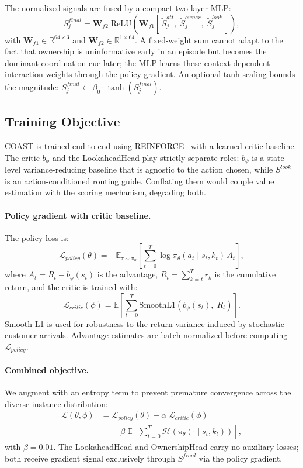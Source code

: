 The normalized signals are fused by a compact two-layer MLP:
\[
S^{final}_j = \mathbf{W}_{f2}\;\mathrm{ReLU}\!\left(\mathbf{W}_{f1}\!\left[\,\tilde{S}^{att}_j,\;\tilde{S}^{owner}_j,\;\tilde{S}^{look}_j\,\right]\right),
\]
with $\mathbf{W}_{f1} \in \mathbb{R}^{64 \times 3}$ and $\mathbf{W}_{f2} \in \mathbb{R}^{1 \times 64}$.
A fixed-weight sum cannot adapt to the fact that ownership is uninformative early in an episode but becomes the dominant coordination cue later; the MLP learns these context-dependent interaction weights through the policy gradient.
An optional tanh scaling bounds the magnitude: $S^{final}_j \leftarrow \beta_0 \cdot \tanh(S^{final}_j)$.

\subsection{Training Objective}\label{sec:training_objective}

COAST is trained end-to-end using REINFORCE~\cite{nazari2018reinforcement} with a learned critic baseline.
The critic $b_\phi$ and the LookaheadHead play strictly separate roles: $b_\phi$ is a state-level variance-reducing baseline that is agnostic to the action chosen, while $S^{look}$ is an action-conditioned routing guide.
Conflating them would couple value estimation with the scoring mechanism, degrading both.

\paragraph{Policy gradient with critic baseline.}
The policy loss is:
\[
\mathcal{L}_{policy}(\theta)
=
-\mathbb{E}_{\tau \sim \pi_\theta}\!\left[\sum_{t=0}^{T} \log \pi_\theta(a_t \mid s_t, k_t)\, A_t \right],
\]
where $A_t = R_t - b_\phi(s_t)$ is the advantage, $R_t = \sum_{k=t}^T r_k$ is the cumulative return, and the critic is trained with:
\[
\mathcal{L}_{critic}(\phi)
=
\mathbb{E}\!\left[\sum_{t=0}^{T} \mathrm{SmoothL1}\!\left(b_\phi(s_t),\; R_t\right)\right].
\]
Smooth-L1 is used for robustness to the return variance induced by stochastic customer arrivals.
Advantage estimates are batch-normalized before computing $\mathcal{L}_{policy}$.

\paragraph{Combined objective.}
We augment with an entropy term to prevent premature convergence across the diverse instance distribution:
\begin{align*}
\mathcal{L}(\theta, \phi)
&= \mathcal{L}_{policy}(\theta)
+ \alpha\; \mathcal{L}_{critic}(\phi) \\
&\quad -\,\beta\;\mathbb{E}\!\left[\sum_{t=0}^{T}
  \mathcal{H}\!\left(\pi_\theta(\cdot \mid s_t, k_t)\right)\right],
\end{align*}
with $\beta = 0.01$.
The LookaheadHead and OwnershipHead carry no auxiliary losses; both receive gradient signal exclusively through $S^{final}$ via the policy gradient.

